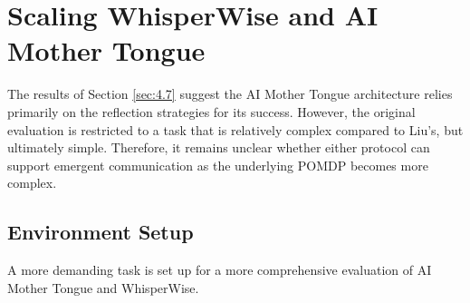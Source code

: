 
\section{Scaling WhisperWise and AI Mother Tongue}
\label{sec:4.8}

The results of Section \ref{sec:4.7} suggest the AI Mother Tongue architecture relies primarily on the reflection strategies for its success.
However, the original evaluation is restricted to a task that is relatively complex compared to Liu's, but ultimately simple.
Therefore, it remains unclear whether either protocol can support emergent communication as the underlying POMDP becomes more complex.

\subsection{Environment Setup}
\label{sec{4.8.1}}

A more demanding task is set up for a more comprehensive evaluation of AI Mother Tongue and WhisperWise.

